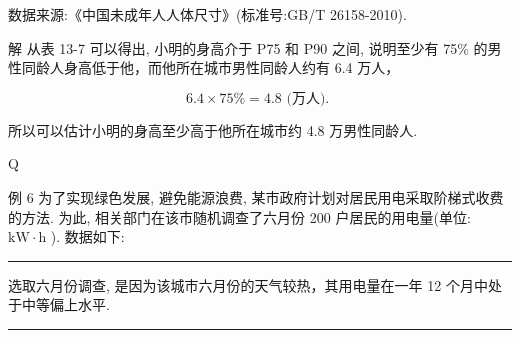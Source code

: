 \documentclass[10pt]{article}
\newcommand{\HRule}{\begin{center}\rule{0.9\linewidth}{0.2mm}\end{center}}
\begin{document}
数据来源:《中国未成年人人体尺寸》(标准号:GB/T 26158-2010).

解 从表 13-7 可以得出, 小明的身高介于 P75 和 P90 之间, 说明至少有 75\% 的男性同龄人身高低于他，而他所在城市男性同龄人约有 6.4 万人，

\[
{6.4} \times  {75}\%  = {4.8}\text{ (万人). }
\]

所以可以估计小明的身高至少高于他所在城市约 4.8 万男性同龄人.

Q

例 6 为了实现绿色发展, 避免能源浪费, 某市政府计划对居民用电采取阶梯式收费的方法. 为此, 相关部门在该市随机调查了六月份 200 户居民的用电量(单位: \(\mathrm{{kW}} \cdot  \mathrm{h}\) ). 数据如下:

\HRule

选取六月份调查, 是因为该城市六月份的天气较热，其用电量在一年 12 个月中处于中等偏上水平.

\HRule

\begin{center}
\end{center}
\end{document}
